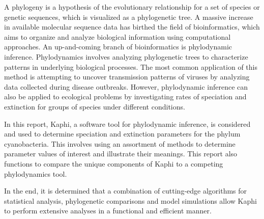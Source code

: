 \documentclass[12pt]{article}
\begin{document}
\UWtableofcontents


	A phylogeny is a hypothesis of the evolutionary relationship for a set of species or genetic sequences, which is visualized as a phylogenetic tree. A massive increase in available molecular sequence data has birthed the field of bioinformatics, which aims to organize and analyze biological information using computational approaches. An up-and-coming branch of bioinformatics is phylodynamic inference. Phylodynamics involves analyzing phylogenetic trees to characterize patterns in underlying biological processes. The most common application of this method is attempting to uncover transmission patterns of viruses by analyzing data collected during disease outbreaks. However, phylodynamic inference can also be applied to ecological problems by investigating rates of speciation and extinction for groups of species under different conditions.

	In this report, Kaphi, a software tool for phylodynamic inference, is considered and used to determine speciation and extinction parameters for the phylum cyanobacteria. This involves using an assortment of methods to determine parameter values of interest and illustrate their meanings. This report also functions to compare the unique components of Kaphi to a competing phylodynamics tool. 
    
    In the end, it is determined that a combination of cutting-edge algorithms for statistical analysis, phylogenetic comparisons and model simulations allow Kaphi to perform extensive analyses in a functional and efficient manner. 

\newpage


\ifoot[]{}
\cfoot[]{}
\ofoot[\pagemark]{\pagemark}
\pagestyle{scrplain}


\end{document}
